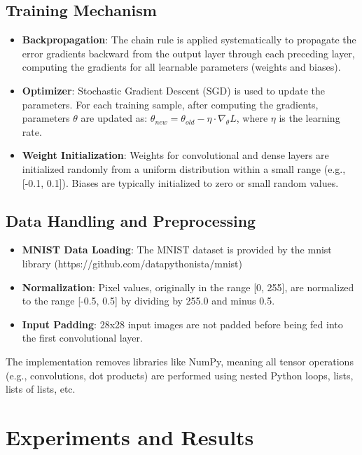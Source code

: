 \documentclass[conference]{IEEEtran}
\begin{document}
\subsection{Training Mechanism}
\begin{itemize}
    \item \textbf{Backpropagation}: The chain rule is applied systematically to propagate the error gradients backward from the output layer through each preceding layer, computing the gradients for all learnable parameters (weights and biases).
    \item \textbf{Optimizer}: Stochastic Gradient Descent (SGD) is used to update the parameters. For each training sample, after computing the gradients, parameters $\theta$ are updated as:
        $\theta_{new} = \theta_{old} - \eta \cdot \nabla_{\theta}L$, where $\eta$ is the learning rate.
    \item \textbf{Weight Initialization}: Weights for convolutional and dense layers are initialized randomly from a uniform distribution within a small range (e.g., [-0.1, 0.1]). Biases are typically initialized to zero or small random values.
\end{itemize}

\subsection{Data Handling and Preprocessing}
\begin{itemize}
    \item \textbf{MNIST Data Loading}: The MNIST dataset is provided by the mnist library (https://github.com/datapythonista/mnist)
    \item \textbf{Normalization}: Pixel values, originally in the range [0, 255], are normalized to the range [-0.5, 0.5] by dividing by 255.0 and minus 0.5.
    \item \textbf{Input Padding}: 28x28 input images are not padded before being fed into the first convolutional layer.
\end{itemize}
The implementation removes libraries like NumPy, meaning all tensor operations (e.g., convolutions, dot products) are performed using nested Python loops, lists, lists of lists, etc.

\section{Experiments and Results}
\end{document}
